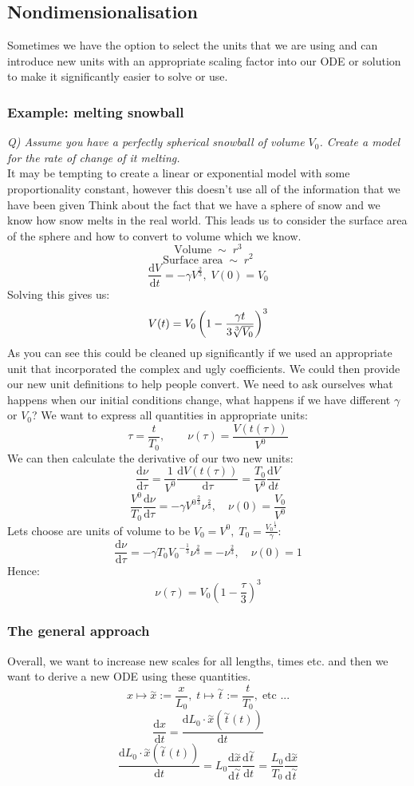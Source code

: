 \documentclass[12pt]{article}
\newcommand{\df}[2]{\frac{\text{d}#1}{\text{d}#2}}
\begin{document}
\subsection*{Nondimensionalisation}
Sometimes we have the option to select the units that we are using and can introduce new units with an appropriate scaling factor into our ODE or solution to make it significantly easier to solve or use.
\subsubsection*{Example: melting snowball}
\textit{Q)  Assume you have a perfectly spherical snowball of volume  \(V_0\). Create a model for the rate of change of it melting.}
\\
It may be tempting to create a linear or exponential model with some proportionality constant, however this doesn't use all of the information that we have been given
Think about the fact that we have a sphere of snow and we know how snow melts in the real world. This leads us to consider the surface area of the sphere and how to convert to volume which we know.
\[\text{Volume}\;\sim\;r^3\]
\[\text{Surface area}\;\sim\;r^2\]
\[\df{V}{t}=-\gamma V^\frac{2}{3},\;V(0)=V_0\]
Solving this gives us:
\[V(t)=V_0\left(1-\frac{\gamma t}{3\sqrt[\leftroot{0}\uproot{1}3]{V_0}}\right)^3\]
As you can see this could be cleaned up significantly if we used an appropriate unit that incorporated the complex and ugly coefficients. We could then provide our new unit definitions to help people convert. We need to ask ourselves what happens when our initial conditions change, what happens if we have different \(\gamma\) or \(V_0\)? We want to express all quantities in appropriate units:
\[\tau=\frac{t}{T_0},\qquad\nu(\tau)=\frac{V(t(\tau))}{V^0}\]
We can then calculate the derivative of our two new units:
\[\df{\nu}{\tau}=\frac{1}{V^0}\df{V(t(\tau))}{\tau}=\frac{T_0}{V^0}\df{V}{t}\]
\[\frac{V^0}{T_0}\df{\nu}{\tau}=-\gamma {V^0}^\frac{2}{3}\nu^\frac{2}{3},\quad \nu(0)=\frac{V_0}{V^0}\]
Lets choose are units of volume to be \(V_0=V^0,\;T_0=\frac{{V_0}^\frac{1}{3}}{\gamma}\):
\[\df{\nu}{\tau}=-\gamma T_0 {V_0}^{-\frac{1}{3}}\nu^\frac{2}{3}=-\nu^\frac{2}{3},\quad \nu(0)=1\]
Hence:
\[\nu(\tau)=V_0\left(1-\frac{\tau}{3}\right)^3\]
\subsubsection*{The general approach}
Overall, we want to increase new scales for all lengths, times etc. and then we want to derive a new ODE using these quantities.
\[x\mapsto\overset{\sim}{x}:=\frac{x}{L_0},\;t\mapsto\overset{\sim}{t}:=\frac{t}{T_0},\;\text{etc ...}\]
\[\df{x}{t}=\df{L_0\cdot\overset{\sim}{x}\left(\overset{\sim}{t}(t)\right)}{t}\]
\[\df{L_0\cdot\overset{\sim}{x}\left(\overset{\sim}{t}(t)\right)}{t}=L_0\df{\overset{\sim}{x}}{\overset{\sim}{t}}\df{\overset{\sim}{t}}{t}=\frac{L_0}{T_0}\df{\overset{\sim}{x}}{\overset{\sim}{t}}\]
\end{document}
